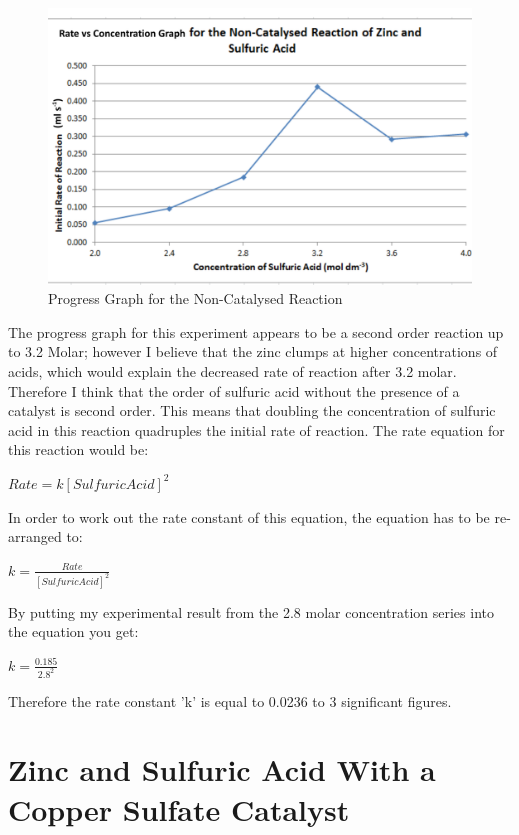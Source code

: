 \begin{figure}[H]
    \includegraphics[width=\textwidth]{./Analysis/Images/1NonCatalyst/ProgressGraph.pdf}
    \caption{Progress Graph for the Non-Catalysed Reaction} \label{fig:ProgressGraphSA}
\end{figure}

The progress graph for this experiment appears to be a second order reaction up to 3.2 Molar; however I believe that the zinc clumps at higher concentrations of acids, which would explain the decreased rate of reaction after 3.2 molar. Therefore I think that the order of sulfuric acid without the presence of a catalyst is second order. This means that doubling the concentration of sulfuric acid in this reaction quadruples the initial rate of reaction. The rate equation for this reaction would be:

$Rate = k [Sulfuric Acid]^2$

In order to work out the rate constant of this equation, the equation has to be re-arranged to:

$k = \frac{Rate}{[Sulfuric Acid]^2}$

By putting my experimental result from the 2.8 molar concentration series into the equation you get:

$k = \frac{0.185}{2.8^2}$

Therefore the rate constant 'k' is equal to 0.0236 to 3 significant figures.



\section{Zinc and Sulfuric Acid With a Copper Sulfate Catalyst} %


